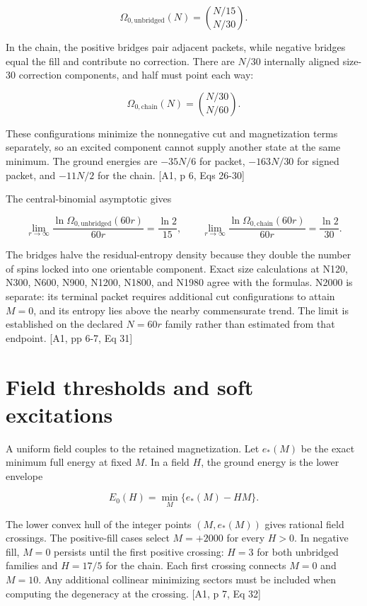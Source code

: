 \[\Omega_{0,\mathrm{unbridged}}(N)=\binom{N/15}{N/30}.\]

In the chain, the positive bridges pair adjacent packets, while negative bridges equal the fill and contribute no correction. There are \(N/30\) internally aligned size-30 correction components, and half must point each way:

\[\Omega_{0,\mathrm{chain}}(N)=\binom{N/30}{N/60}.\]

These configurations minimize the nonnegative cut and magnetization terms separately, so an excited component cannot supply another state at the same minimum. The ground energies are \(-35N/6\) for packet, \(-163N/30\) for signed packet, and \(-11N/2\) for the chain. {[}A1, p 6, Eqs 26-30{]}

The central-binomial asymptotic gives

\[\lim_{r\to\infty}\frac{\ln\Omega_{0,\mathrm{unbridged}}(60r)}{60r}=\frac{\ln2}{15},\qquad
\lim_{r\to\infty}\frac{\ln\Omega_{0,\mathrm{chain}}(60r)}{60r}=\frac{\ln2}{30}.\]

The bridges halve the residual-entropy density because they double the number of spins locked into one orientable component. Exact size calculations at N120, N300, N600, N900, N1200, N1800, and N1980 agree with the formulas. N2000 is separate: its terminal packet requires additional cut configurations to attain \(M=0\), and its entropy lies above the nearby commensurate trend. The limit is established on the declared \(N=60r\) family rather than estimated from that endpoint. {[}A1, pp 6-7, Eq 31{]}

\section{Field thresholds and soft excitations}\label{field-thresholds-and-soft-excitations}

A uniform field couples to the retained magnetization. Let \(e_*(M)\) be the exact minimum full energy at fixed \(M\). In a field \(H\), the ground energy is the lower envelope

\[E_0(H)=\min_M\{e_*(M)-HM\}.\]

The lower convex hull of the integer points \((M,e_*(M))\) gives rational field crossings. The positive-fill cases select \(M=+2000\) for every \(H>0\). In negative fill, \(M=0\) persists until the first positive crossing: \(H=3\) for both unbridged families and \(H=17/5\) for the chain. Each first crossing connects \(M=0\) and \(M=10\). Any additional collinear minimizing sectors must be included when computing the degeneracy at the crossing. {[}A1, p 7, Eq 32{]}

